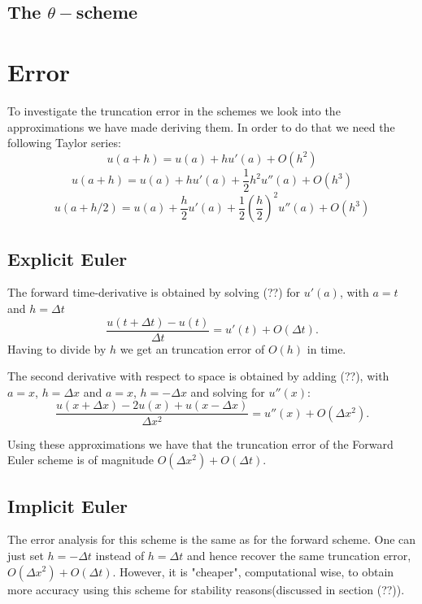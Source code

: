 \documentclass[11pt,a4paper,draft]{article}
\numberwithin{equation}{section}
\begin{document}
\subsection{The $\theta-$scheme}

\section{Error}

To investigate the truncation error in the schemes we look into the approximations we have made deriving them. In order to do that we need the following Taylor series:
\begin{equation}
u(a+h) = u(a) +hu'(a)+O(h^2)
\end{equation}
\begin{equation}
u(a+h) = u(a) +hu'(a)+\frac{1}{2}h^2 u''(a) +O(h^3)
\end{equation}
\begin{equation}
u(a+h/2) = u(a) +\frac{h}{2}u'(a) + \frac{1}{2} \left( \frac{h}{2} \right)^2 u''(a) + O(h^3)
\end{equation}

\subsection{Explicit Euler}
The forward time-derivative is obtained by solving (??) for $u'(a)$, with $a=t$ and $h=\Delta t$
\begin{equation}
\frac{u(t+\Delta t)-u(t)}{\Delta t} = u'(t)+O(\Delta t).
\end{equation}  
Having to divide by $h$ we get an truncation error of $O(h)$ in time.

The second derivative with respect to space is obtained by adding (??), with $a=x$,  $h=\Delta x$ and 
$a=x$,  $h= -\Delta x$ and solving for $u''(x)$:
\begin{equation}
\frac{u(x+\Delta x)-2u(x)+u(x-\Delta x)}{\Delta x^2} = u''(x)+O(\Delta x^2).
\end{equation}  

Using these approximations we have that the truncation error of the Forward Euler scheme is of magnitude $O(\Delta x^2)+O(\Delta t)$.  

\subsection{Implicit Euler}
The error analysis for this scheme is the same as for the forward scheme. One can just set $h=- \Delta t$
instead of $h=\Delta t$ and hence recover the same truncation error, $O(\Delta x^2)+O(\Delta t)$. However, it is "cheaper", computational wise, to obtain more accuracy using this scheme for stability reasons(discussed in section (??)). 
\end{document}
